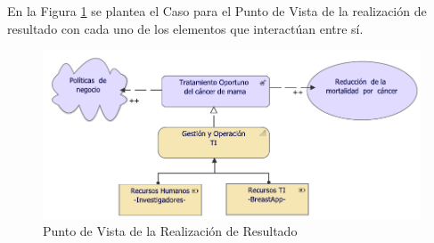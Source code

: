 En la Figura \ref{PvRealizacion} se plantea el Caso para el Punto de Vista de la realización de resultado con cada uno de los elementos que interactúan entre sí. 

\begin{figure}[h!]
	\centering
	\includegraphics[width=1\linewidth]{ARQUITECTURA/imgs/CapaEstrategica/3_PvRealizacion}
	\caption{Punto de Vista de la Realización de Resultado}
	\label{PvRealizacion}
\end{figure}



